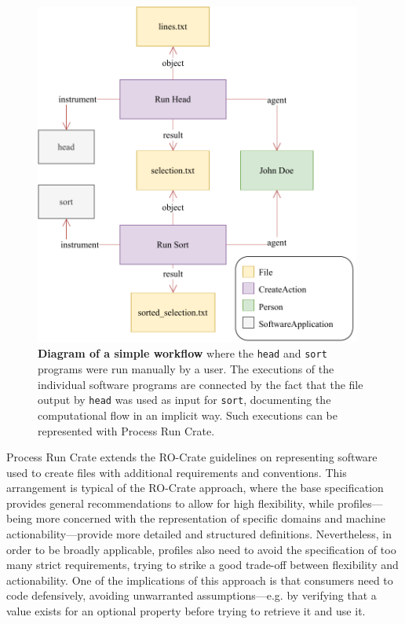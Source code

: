 \begin{figure}[htp]
\centering
\includegraphics[width=29em]{figures/ch54/wrroc-figure-example.drawio.pdf}
\caption[Diagram of a simple workflow]{{\bf Diagram of a simple workflow} where the \texttt{head} and \texttt{sort} programs were run manually by a user.
The executions of the individual software programs are connected by the fact that the file output by \texttt{head} was used as input for \texttt{sort}, documenting the computational flow in an implicit way.
Such executions can be represented with Process Run Crate.}
\label{ch54:fig:head_sort}
\end{figure}


Process Run Crate extends the RO-Crate guidelines on representing software used to create files with additional requirements and conventions.
This arrangement is typical of the RO-Crate approach, where the base specification provides general recommendations to allow for high flexibility, while profiles---being more concerned with the representation of specific domains and machine actionability---provide more detailed and structured definitions.
Nevertheless, in order to be broadly applicable, profiles also need to avoid the specification of too many strict requirements, trying to strike a good trade-off between flexibility and actionability.
One of the implications of this approach is that consumers need to code defensively, avoiding unwarranted assumptions---e.g. by verifying that a value exists for an optional property before trying to retrieve it and use it.


